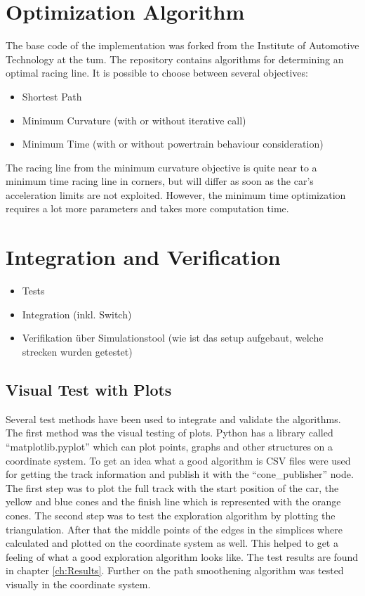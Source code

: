 \section{Optimization Algorithm} \label{sec:Optimization Algorithm}
The base code of the implementation was forked from the Institute of Automotive Technology at the \acrlong{tum}. \cite{tumftm_optimization_algoritm}
The repository contains algorithms for determining an optimal racing line. It is possible to choose between several objectives:
\begin{itemize}
    \item Shortest Path
    \item Minimum Curvature (with or without iterative call)
    \item Minimum Time (with or without powertrain behaviour consideration)
\end{itemize}
The racing line from the minimum curvature objective is quite near to a minimum time racing line in corners, but will differ as soon as the car's acceleration limits are not exploited. However, the minimum time optimization requires a lot more parameters and takes more computation time.

\section{Integration and Verification} \label{sec:Integration and Verification}

\begin{itemize}
    \item Tests
    \item Integration (inkl. Switch)
    \item Verifikation über Simulationstool (wie ist das setup aufgebaut, welche strecken wurden getestet)
\end{itemize}

\subsection{Visual Test with Plots} \label{sec:Visual Test with Plots}
Several test methods have been used to integrate and validate the algorithms. The first method was the visual testing of plots. Python has a library called ``matplotlib.pyplot'' which can plot points, graphs and other structures on a coordinate system. To get an idea what a good algorithm is CSV files were used for getting the track information and publish it with the ``cone\_publisher'' node. The first step was to plot the full track with the start position of the car, the yellow and blue cones and the finish line which is represented with the orange cones. The second step was to test the exploration algorithm by plotting the triangulation. After that the middle points of the edges in the simplices where calculated and plotted on the coordinate system as well. This helped to get a feeling of what a good exploration algorithm looks like. The test results are found in chapter \ref{ch:Results}. Further on the path smoothening algorithm was tested visually in the coordinate system.

